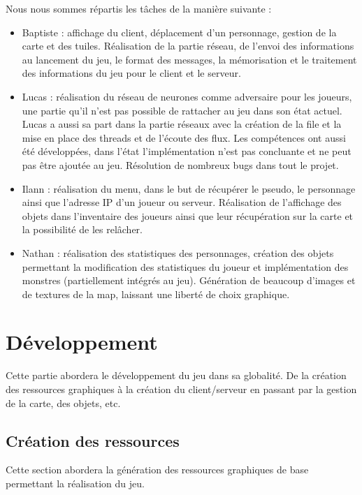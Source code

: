 \documentclass[11pt]{article}
\begin{document}
        Nous nous sommes répartis les tâches de la manière suivante :
        \begin{itemize}
            \item Baptiste : affichage du client, déplacement d’un personnage, gestion de la carte et des tuiles. Réalisation de la partie réseau, de l’envoi des informations au lancement du jeu, le format des messages, la mémorisation et le traitement des informations du jeu pour le client et le serveur.       
            \item Lucas : réalisation du réseau de neurones comme adversaire pour les joueurs, une partie qu'il n’est pas possible de rattacher au jeu dans son état actuel. Lucas a aussi sa part dans la partie réseaux avec la création de la file et la mise en place des threads et de l’écoute des flux. Les compétences ont aussi été développées, dans l’état l’implémentation n’est pas concluante et ne peut pas être ajoutée au jeu. Résolution de nombreux bugs dans tout le projet. 
            \item Ilann : réalisation du menu, dans le but de récupérer le pseudo, le personnage ainsi que l'adresse IP d’un joueur ou serveur. Réalisation de l’affichage des objets dans l’inventaire des joueurs ainsi que leur récupération sur la carte et la possibilité de les relâcher.  
            \item Nathan : réalisation des statistiques des personnages, création des objets permettant la modification des statistiques du joueur et implémentation des monstres (partiellement intégrés au jeu). Génération de beaucoup d'images et de textures de la map, laissant une liberté de choix graphique.
        \end{itemize}
    \section{Développement}
    Cette partie abordera le développement du jeu dans sa globalité. De la création des ressources graphiques à la création du client/serveur en passant par la gestion de la carte, des objets, etc. 
        \subsection{Création des ressources}
        Cette section abordera la génération des ressources graphiques de base permettant la réalisation du jeu.
\end{document}
